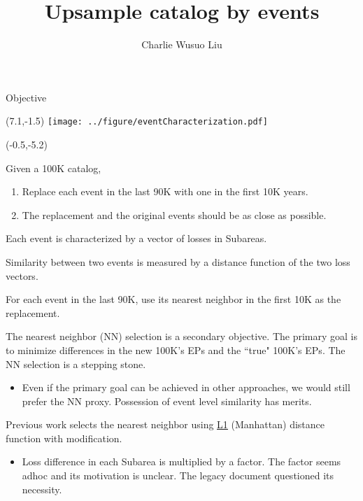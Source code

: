 \documentclass[aspectratio=169]{beamer}
\title{Upsample catalog by events}
\author{Charlie Wusuo Liu}
\begin{document}
\begin{frame}{Objective}
\begin{textblock}{1}(7.1,-1.5)
\texttt{[image: ../figure/eventCharacterization.pdf]}
\end{textblock}


\begin{textblock}{7.25}(-0.5,-5.2)

\tiny Given a 100K catalog,\smallskip

\begin{enumerate}
\tiny\item Replace each event in the last 90K with one in the first 10K years.\medskip

\tiny\item The replacement and the original events should be as close as possible.\medskip
\end{enumerate}

\tiny Each event is characterized by a vector of losses in Subareas.\medskip\pause

\tiny Similarity between two events is measured by a distance function of the two loss vectors.\medskip

\tiny For each event in the last 90K, use its nearest neighbor in the first 10K as the replacement.\medskip\pause

\tiny The nearest neighbor (NN) selection is a secondary objective. The primary goal is to minimize differences in the new 100K's EPs and the ``true" 100K's EPs. The NN selection is a stepping stone.\medskip\pause

\begin{itemize}
\tiny\item Even if the primary goal can be achieved in other approaches, we would still prefer the NN proxy. Possession of event level similarity has merits.\medskip\pause 
\end{itemize}

\tiny Previous work selects the nearest neighbor using \underline{\textcolor{blue}{\href{https://en.wikipedia.org/wiki/Taxicab_geometry}{L1}}} (Manhattan) distance function with modification.\smallskip\pause

\begin{itemize}
\tiny\item Loss difference in each Subarea is multiplied by a factor. The factor seems adhoc and its motivation is unclear. The legacy document questioned its necessity. 
\end{itemize}
\end{textblock}
\end{frame}
\end{document}
